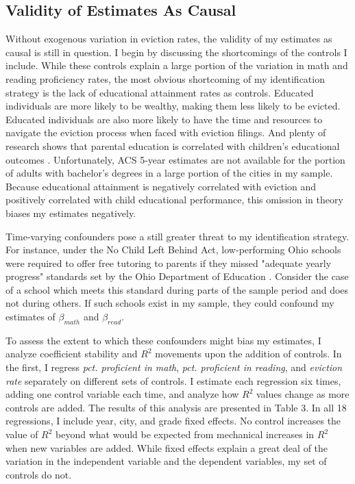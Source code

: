 \documentclass[12pt]{article}
\begin{document}
\subsection{Validity of Estimates As Causal}
Without exogenous variation in eviction rates, the validity of my estimates as causal is still in question. I begin by discussing the shortcomings of the controls I include. While these controls explain a large portion of the variation in math and reading proficiency rates, the most obvious shortcoming of my identification strategy is the lack of educational attainment rates as controls. Educated individuals are more likely to be wealthy, making them less likely to be evicted. Educated individuals are also more likely to have the time and resources to navigate the eviction process when faced with eviction filings. And plenty of research shows that parental education is correlated with children's educational outcomes \citep{havemen}. Unfortunately, ACS 5-year estimates are not available for the portion of adults with bachelor's degrees in a large portion of the cities in my sample. Because educational attainment is negatively correlated with eviction and positively correlated with child educational performance, this omission in theory biases my estimates negatively. 


Time-varying confounders pose a still greater threat to my identification strategy. For instance, under the No Child Left Behind Act, low-performing Ohio schools were required to offer free tutoring to parents if they missed "adequate yearly progress" standards set by the Ohio Department of Education \citep{klein_no_2015}. Consider the case of a school which meets this standard during parts of the sample period and does not during others. If such schools exist in my sample, they could confound my estimates of $\beta_{math}$ and $\beta_{read}$.


To assess the extent to which these confounders might bias my estimates, I analyze coefficient stability and $R^2$ movements upon the addition of controls. In the first, I regress \emph{pct. proficient in math}, \emph{pct. proficient in reading}, and \emph{eviction rate} separately on different sets of controls. I estimate each regression six times, adding one control variable each time, and analyze how $R^2$ values change as more controls are added. The results of this analysis are presented in Table 3. In all 18 regressions, I include year, city, and grade fixed effects. No control increases the value of $R^2$ beyond what would be expected from mechanical increases in $R^2$ when new variables are added. While fixed effects explain a great deal of the variation in the independent variable and the dependent variables, my set of controls do not.
\end{document}
